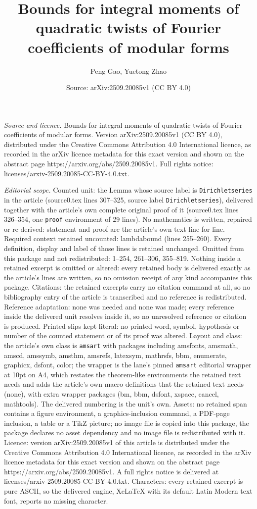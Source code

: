 \documentclass[10pt,a4paper]{amsart}
\title[Bounds for integral moments of quadratic twists of Fourier c]{Bounds for integral moments of quadratic twists of Fourier coefficients of modular forms}
\author{Peng Gao, Yuetong Zhao}
\date{Source: arXiv:2509.20085v1 (CC BY 4.0)}
\begin{document}
\maketitle

\noindent\emph{Source and licence.} Bounds for integral moments of quadratic twists of Fourier coefficients of modular forms. Version arXiv:2509.20085v1 (CC BY 4.0), distributed under the Creative Commons Attribution 4.0 International licence, as recorded in the arXiv licence metadata for this exact version and shown on the abstract page https://arxiv.org/abs/2509.20085v1. Full rights notice: licenses/arxiv-2509.20085-CC-BY-4.0.txt.\par\smallskip

\noindent\textit{Editorial scope.} Counted unit: the Lemma whose source label is \texttt{Dirichletseries} in the article (source0.tex lines 307--325, source label \texttt{Dirichletseries}), delivered together with the article's own complete original proof of it (source0.tex lines 326--354, one \texttt{proof} environment of 29 lines). No mathematics is written, repaired or re-derived: statement and proof are the article's own text line for line. Required context retained uncounted: lambdabound (lines 255--260). Every definition, display and label of those lines is retained unchanged. Omitted from this package and not redistributed: 1--254, 261--306, 355--819. Nothing inside a retained excerpt is omitted or altered: every retained body is delivered exactly as the article's lines are written, so no omission receipt of any kind accompanies this package. Citations: the retained excerpts carry no citation command at all, so no bibliography entry of the article is transcribed and no reference is redistributed. Reference adaptation: none was needed and none was made; every reference inside the delivered unit resolves inside it, so no unresolved reference or citation is produced. Printed slips kept literal: no printed word, symbol, hypothesis or number of the counted statement or of its proof was altered. Layout and class: the article's own class is \texttt{amsart} with packages including amsfonts, amsmath, amscd, amssymb, amsthm, amsrefs, latexsym, mathrsfs, bbm, enumerate, graphicx, dsfont, color; the wrapper is the lane's pinned \texttt{amsart} editorial wrapper at 10pt on A4, which restates the theorem-like environments the retained text needs and adds the article's own macro definitions that the retained text needs (none), with extra wrapper packages (bm, bbm, dsfont, xspace, cancel, mathtools). The delivered numbering is the unit's own. Assets: no retained span contains a figure environment, a graphics-inclusion command, a PDF-page inclusion, a table or a TikZ picture; no image file is copied into this package, the package declares no asset dependency and no image file is redistributed with it. Licence: version arXiv:2509.20085v1 of this article is distributed under the Creative Commons Attribution 4.0 International licence, as recorded in the arXiv licence metadata for this exact version and shown on the abstract page https://arxiv.org/abs/2509.20085v1. A full rights notice is delivered at licenses/arxiv-2509.20085-CC-BY-4.0.txt. Characters: every retained excerpt is pure ASCII, so the delivered engine, XeLaTeX with its default Latin Modern text font, reports no missing character.
\end{document}
